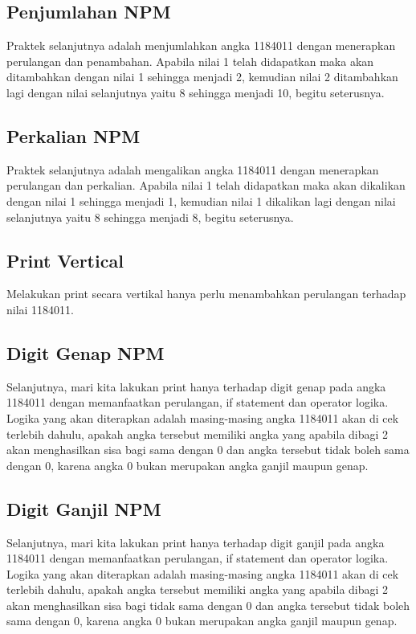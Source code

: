 \subsection{Penjumlahan NPM}
Praktek selanjutnya adalah menjumlahkan angka 1184011 dengan menerapkan perulangan dan penambahan. Apabila nilai 1 telah didapatkan maka akan ditambahkan dengan nilai 1 sehingga menjadi 2, kemudian nilai 2 ditambahkan lagi dengan nilai selanjutnya yaitu 8 sehingga menjadi 10, begitu seterusnya.

\subsection{Perkalian NPM}
Praktek selanjutnya adalah mengalikan angka 1184011 dengan menerapkan perulangan dan perkalian. Apabila nilai 1 telah didapatkan maka akan dikalikan dengan nilai 1 sehingga menjadi 1, kemudian nilai 1 dikalikan lagi dengan nilai selanjutnya yaitu 8 sehingga menjadi 8, begitu seterusnya.

\subsection{Print Vertical}
Melakukan print secara vertikal hanya perlu menambahkan perulangan terhadap nilai 1184011.

\subsection{Digit Genap NPM}
Selanjutnya, mari kita lakukan print hanya terhadap digit genap pada angka 1184011 dengan memanfaatkan perulangan, if statement dan operator logika. Logika yang akan diterapkan adalah masing-masing angka 1184011 akan di cek terlebih dahulu, apakah angka tersebut memiliki angka yang apabila dibagi 2 akan menghasilkan sisa bagi sama dengan 0 dan angka tersebut tidak boleh sama dengan 0, karena angka 0 bukan merupakan angka ganjil maupun genap.

\subsection{Digit Ganjil NPM}
Selanjutnya, mari kita lakukan print hanya terhadap digit ganjil pada angka 1184011 dengan memanfaatkan perulangan, if statement dan operator logika. Logika yang akan diterapkan adalah masing-masing angka 1184011 akan di cek terlebih dahulu, apakah angka tersebut memiliki angka yang apabila dibagi 2 akan menghasilkan sisa bagi tidak sama dengan 0 dan angka tersebut tidak boleh sama dengan 0, karena angka 0 bukan merupakan angka ganjil maupun genap.

